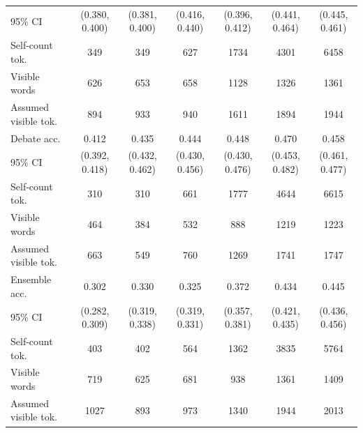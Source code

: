 \documentclass{article} %
\begin{document}
\begin{table}[t]
{\begin{tabular}{lcccccc}
95\% CI & (0.380, 0.400) & (0.381, 0.400) & (0.416, 0.440) & (0.396, 0.412) & (0.441, 0.464) & (0.445, 0.461) \\
Self-count tok. & 349 & 349 & 627 & 1734 & 4301 & 6458 \\
Visible words & 626 & 653 & 658 & 1128 & 1326 & 1361 \\
Assumed visible tok. & 894 & 933 & 940 & 1611 & 1894 & 1944 \\
\midrule
Debate acc. & 0.412 & 0.435 & 0.444 & 0.448 & 0.470 & 0.458 \\
95\% CI & (0.392, 0.418) & (0.432, 0.462) & (0.430, 0.456) & (0.430, 0.476) & (0.453, 0.482) & (0.461, 0.477) \\
Self-count tok. & 310 & 310 & 661 & 1777 & 4644 & 6615 \\
Visible words & 464 & 384 & 532 & 888 & 1219 & 1223 \\
Assumed visible tok. & 663 & 549 & 760 & 1269 & 1741 & 1747 \\
\midrule
Ensemble acc. & 0.302 & 0.330 & 0.325 & 0.372 & 0.434 & 0.445 \\
95\% CI & (0.282, 0.309) & (0.319, 0.338) & (0.319, 0.331) & (0.357, 0.381) & (0.421, 0.435) & (0.436, 0.456) \\
Self-count tok. & 403 & 402 & 564 & 1362 & 3835 & 5764 \\
Visible words & 719 & 625 & 681 & 938 & 1361 & 1409 \\
Assumed visible tok. & 1027 & 893 & 973 & 1340 & 1944 & 2013 \\
\bottomrule
\end{tabular}}
\end{table}
\end{document}
